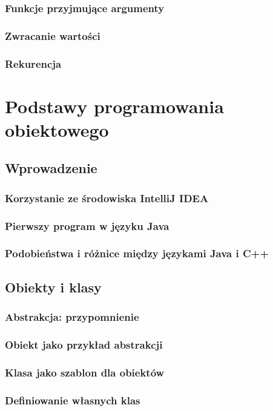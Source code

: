 \documentclass[11pt]{book}
\begin{document}
\section{Funkcje przyjmujące argumenty}
\section{Zwracanie wartości}
\section{Rekurencja}


\part{Podstawy programowania obiektowego}
\chapter{Wprowadzenie}
\section{Korzystanie ze środowiska IntelliJ IDEA}
\section{Pierwszy program w języku Java}
\section{Podobieństwa i różnice między językami Java i C++}

\chapter{Obiekty i klasy}
\section{Abstrakcja: przypomnienie}
\section{Obiekt jako przykład abstrakcji}
\section{Klasa jako szablon dla obiektów}
\section{Definiowanie własnych klas}
\end{document}
